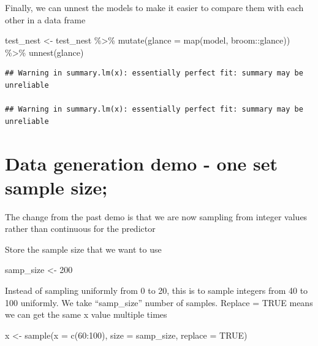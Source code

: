 \documentclass[
]{book}
\newenvironment{Shaded}{\begin{snugshade}}{\end{snugshade}}
\newcommand{\AttributeTok}[1]{\textcolor[rgb]{0.77,0.63,0.00}{#1}}
\newcommand{\ConstantTok}[1]{\textcolor[rgb]{0.00,0.00,0.00}{#1}}
\newcommand{\DecValTok}[1]{\textcolor[rgb]{0.00,0.00,0.81}{#1}}
\newcommand{\FunctionTok}[1]{\textcolor[rgb]{0.00,0.00,0.00}{#1}}
\newcommand{\NormalTok}[1]{#1}
\newcommand{\OtherTok}[1]{\textcolor[rgb]{0.56,0.35,0.01}{#1}}
\newcommand{\SpecialCharTok}[1]{\textcolor[rgb]{0.00,0.00,0.00}{#1}}
\begin{document}
Finally, we can unnest the models to make it easier to compare them with each other in a data frame

\begin{Shaded}
\begin{Highlighting}[]
\NormalTok{test\_nest }\OtherTok{\textless{}{-}}\NormalTok{ test\_nest }\SpecialCharTok{\%\textgreater{}\%} 
  \FunctionTok{mutate}\NormalTok{(}\AttributeTok{glance =} \FunctionTok{map}\NormalTok{(model, broom}\SpecialCharTok{::}\NormalTok{glance)) }\SpecialCharTok{\%\textgreater{}\%} 
  \FunctionTok{unnest}\NormalTok{(glance)}
\end{Highlighting}
\end{Shaded}

\begin{verbatim}
## Warning in summary.lm(x): essentially perfect fit: summary may be unreliable

## Warning in summary.lm(x): essentially perfect fit: summary may be unreliable
\end{verbatim}

\hypertarget{data-generation-demo---one-set-sample-size-1}{%
\section{Data generation demo - one set sample size;}\label{data-generation-demo---one-set-sample-size-1}}

The change from the past demo is that we are now sampling from integer values rather than continuous for the predictor

Store the sample size that we want to use

\begin{Shaded}
\begin{Highlighting}[]
\NormalTok{samp\_size }\OtherTok{\textless{}{-}} \DecValTok{200}
\end{Highlighting}
\end{Shaded}

Instead of sampling uniformly from 0 to 20, this is to sample integers from 40 to 100 uniformly.
We take ``samp\_size'' number of samples. Replace = TRUE means we can get the same x value multiple times

\begin{Shaded}
\begin{Highlighting}[]
\NormalTok{x }\OtherTok{\textless{}{-}} \FunctionTok{sample}\NormalTok{(}\AttributeTok{x =} \FunctionTok{c}\NormalTok{(}\DecValTok{60}\SpecialCharTok{:}\DecValTok{100}\NormalTok{), }\AttributeTok{size =}\NormalTok{ samp\_size, }\AttributeTok{replace =} \ConstantTok{TRUE}\NormalTok{)}
\end{Highlighting}
\end{Shaded}
\end{document}
